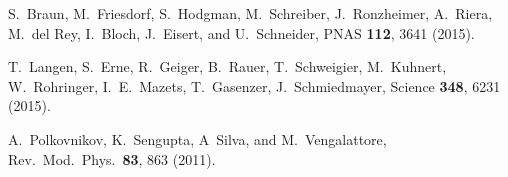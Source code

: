 \documentclass[11pt]{iopart}
\begin{document}
\begin{thebibliography}{99}
S.~Braun, M.~Friesdorf, S.~Hodgman, M.~Schreiber, J.~Ronzheimer, A.~Riera, M.~del Rey,
I.~Bloch, J.~Eisert, and U.~Schneider, PNAS {\bf 112}, 3641 (2015).

T.~Langen, S.~Erne, R.~Geiger, B.~Rauer, T.~Schweigier, M.~Kuhnert, W.~Rohringer,
I.~E.~Mazets, T.~Gasenzer, J.~Schmiedmayer, Science {\bf 348}, 6231 (2015).

A.~Polkovnikov, K.~Sengupta, A~Silva, and M.~Vengalattore, Rev.\ Mod.\ Phys.\
{\bf 83}, 863 (2011).

\end{thebibliography}
\end{document}
